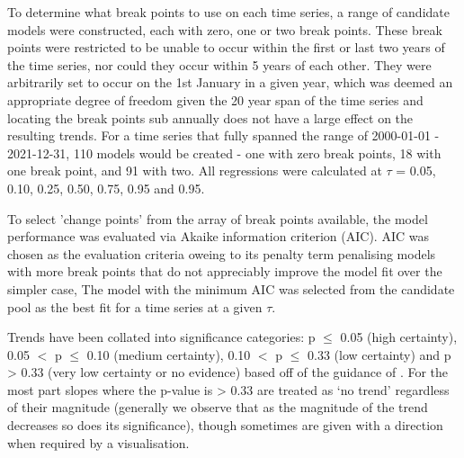 \documentclass[journal abbreviation, manuscript]{copernicus}
\begin{document}
To determine what break points to use on each time series, a range of candidate models were constructed, each with zero, one or two break points. These break points were restricted to be unable to occur within the first or last two years of the time series, nor could they occur within 5 years of each other. They were arbitrarily set to occur on the 1st January in a given year, which was deemed an appropriate degree of freedom given the 20 year span of the time series and locating the break points sub annually does not have a large effect on the resulting trends. For a time series that fully spanned the range of 2000-01-01 - 2021-12-31, 110 models would be created - one with zero break points, 18 with one break point, and 91 with two. All regressions were calculated at $\tau$ = 0.05, 0.10, 0.25, 0.50, 0.75, 0.95 and 0.95.

To select 'change points' from the array of break points available, the model performance was evaluated via Akaike information criterion (AIC). AIC was chosen as the evaluation criteria oweing to its penalty term penalising models with more break points that do not appreciably improve the model fit over the simpler case, The model with the minimum AIC was selected from the candidate pool as the best fit for a time series at a given $\tau$. 

Trends have been collated into significance categories: p $\le$ 0.05 (high certainty), 0.05 $<$ p $\le$ 0.10 (medium certainty), 0.10 $<$ p $\le$ 0.33 (low certainty) and p > 0.33 (very low certainty or no evidence) based off of the guidance of \cite{chang2023guidancenotebeststatistical}. For the most part slopes where the p-value is > 0.33 are treated as ‘no trend’ regardless of their magnitude (generally we observe that as the magnitude of the trend decreases so does its significance), though sometimes are given with a direction when required by a visualisation.
\end{document}
